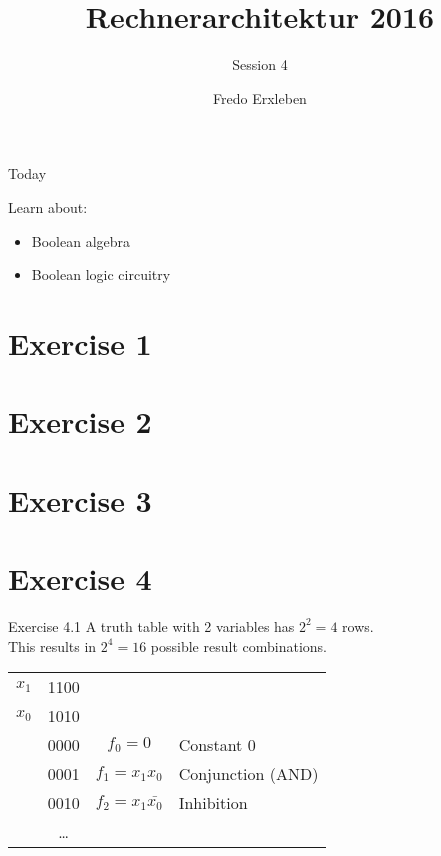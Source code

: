 \documentclass[11pt]{tudbeamer}
\title{Rechnerarchitektur 2016}
\subtitle{Session 4}
\author{Fredo Erxleben}
\begin{document}
  \maketitle

\begin{frame}{Today}

	Learn about:
	\begin{itemize}
		\item Boolean algebra
		\item Boolean logic circuitry
	\end{itemize}

\end{frame}

\section{Exercise 1}
\section{Exercise 2}
\section{Exercise 3}
\section{Exercise 4}

\begin{frame}[allowframebreaks]{Exercise 4.1}
	A truth table with 2 variables has $2^2 = 4$ rows. \\
	This results in $2^4 = 16$ possible result combinations.
	
\framebreak

	\begin{tabular}{lccl}
	$x_1$ 	& 1100 &&\\
	$x_0$ 	& 1010 &&\\
	\hline
			& 0000 & $f_0 = 0$ & Constant 0 \\
			& 0001 & $f_1 = x_1 x_0$ & Conjunction (AND) \\
			& 0010 & $f_2 = x_1 \bar{x_0}$ & Inhibition \\
			& \dots &&\\
	\end{tabular}	
	
\end{frame}
\end{document}
